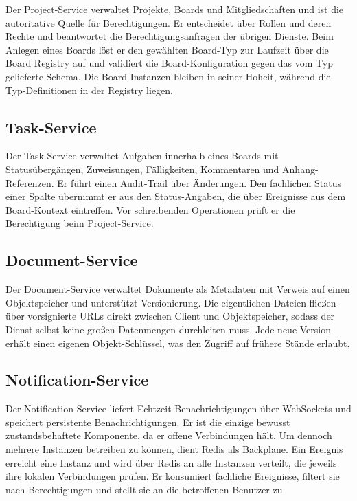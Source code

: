 Der Project-Service verwaltet Projekte, Boards und Mitgliedschaften und ist die autoritative Quelle für Berechtigungen. Er entscheidet über Rollen und deren Rechte und beantwortet die Berechtigungsanfragen der übrigen Dienste. Beim Anlegen eines Boards löst er den gewählten Board-Typ zur Laufzeit über die Board Registry auf und validiert die Board-Konfiguration gegen das vom Typ gelieferte Schema. Die Board-Instanzen bleiben in seiner Hoheit, während die Typ-Definitionen in der Registry liegen.

\subsection{Task-Service}
\label{sub:task}

Der Task-Service verwaltet Aufgaben innerhalb eines Boards mit Statusübergängen, Zuweisungen, Fälligkeiten, Kommentaren und Anhang-Referenzen. Er führt einen Audit-Trail über Änderungen. Den fachlichen Status einer Spalte übernimmt er aus den Status-Angaben, die über Ereignisse aus dem Board-Kontext eintreffen. Vor schreibenden Operationen prüft er die Berechtigung beim Project-Service.

\subsection{Document-Service}
\label{sub:document}

Der Document-Service verwaltet Dokumente als Metadaten mit Verweis auf einen Objektspeicher und unterstützt Versionierung. Die eigentlichen Dateien fließen über vorsignierte URLs direkt zwischen Client und Objektspeicher, sodass der Dienst selbst keine großen Datenmengen durchleiten muss. Jede neue Version erhält einen eigenen Objekt-Schlüssel, was den Zugriff auf frühere Stände erlaubt.

\subsection{Notification-Service}
\label{sub:notification}

Der Notification-Service liefert Echtzeit-Benachrichtigungen über WebSockets und speichert persistente Benachrichtigungen. Er ist die einzige bewusst zustandsbehaftete Komponente, da er offene Verbindungen hält. Um dennoch mehrere Instanzen betreiben zu können, dient Redis als Backplane. Ein Ereignis erreicht eine Instanz und wird über Redis an alle Instanzen verteilt, die jeweils ihre lokalen Verbindungen prüfen. Er konsumiert fachliche Ereignisse, filtert sie nach Berechtigungen und stellt sie an die betroffenen Benutzer zu.

